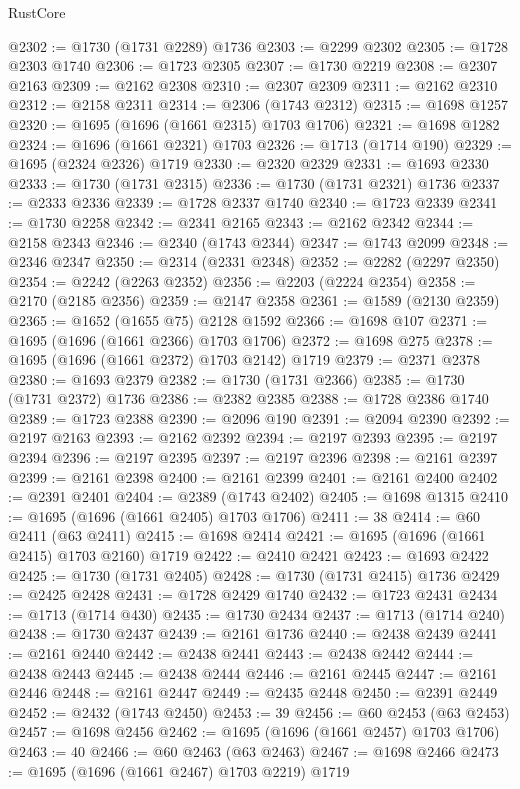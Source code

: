 \begin{lexlean}{RustCore}
\begin{coremodule}
@2302 := @1730 (@1731 @2289) @1736
@2303 := @2299 @2302
@2305 := @1728 @2303 @1740
@2306 := @1723 @2305
@2307 := @1730 @2219
@2308 := @2307 @2163
@2309 := @2162 @2308
@2310 := @2307 @2309
@2311 := @2162 @2310
@2312 := @2158 @2311
@2314 := @2306 (@1743 @2312)
@2315 := @1698 @1257
@2320 := @1695 (@1696 (@1661 @2315) @1703 @1706)
@2321 := @1698 @1282
@2324 := @1696 (@1661 @2321) @1703
@2326 := @1713 (@1714 @190)
@2329 := @1695 (@2324 @2326) @1719
@2330 := @2320 @2329
@2331 := @1693 @2330
@2333 := @1730 (@1731 @2315)
@2336 := @1730 (@1731 @2321) @1736
@2337 := @2333 @2336
@2339 := @1728 @2337 @1740
@2340 := @1723 @2339
@2341 := @1730 @2258
@2342 := @2341 @2165
@2343 := @2162 @2342
@2344 := @2158 @2343
@2346 := @2340 (@1743 @2344)
@2347 := @1743 @2099
@2348 := @2346 @2347
@2350 := @2314 (@2331 @2348)
@2352 := @2282 (@2297 @2350)
@2354 := @2242 (@2263 @2352)
@2356 := @2203 (@2224 @2354)
@2358 := @2170 (@2185 @2356)
@2359 := @2147 @2358
@2361 := @1589 (@2130 @2359)
@2365 := @1652 (@1655 @75) @2128 @1592
@2366 := @1698 @107
@2371 := @1695 (@1696 (@1661 @2366) @1703 @1706)
@2372 := @1698 @275
@2378 := @1695 (@1696 (@1661 @2372) @1703 @2142) @1719
@2379 := @2371 @2378
@2380 := @1693 @2379
@2382 := @1730 (@1731 @2366)
@2385 := @1730 (@1731 @2372) @1736
@2386 := @2382 @2385
@2388 := @1728 @2386 @1740
@2389 := @1723 @2388
@2390 := @2096 @190
@2391 := @2094 @2390
@2392 := @2197 @2163
@2393 := @2162 @2392
@2394 := @2197 @2393
@2395 := @2197 @2394
@2396 := @2197 @2395
@2397 := @2197 @2396
@2398 := @2161 @2397
@2399 := @2161 @2398
@2400 := @2161 @2399
@2401 := @2161 @2400
@2402 := @2391 @2401
@2404 := @2389 (@1743 @2402)
@2405 := @1698 @1315
@2410 := @1695 (@1696 (@1661 @2405) @1703 @1706)
@2411 := 38
@2414 := @60 @2411 (@63 @2411)
@2415 := @1698 @2414
@2421 := @1695 (@1696 (@1661 @2415) @1703 @2160) @1719
@2422 := @2410 @2421
@2423 := @1693 @2422
@2425 := @1730 (@1731 @2405)
@2428 := @1730 (@1731 @2415) @1736
@2429 := @2425 @2428
@2431 := @1728 @2429 @1740
@2432 := @1723 @2431
@2434 := @1713 (@1714 @430)
@2435 := @1730 @2434
@2437 := @1713 (@1714 @240)
@2438 := @1730 @2437
@2439 := @2161 @1736
@2440 := @2438 @2439
@2441 := @2161 @2440
@2442 := @2438 @2441
@2443 := @2438 @2442
@2444 := @2438 @2443
@2445 := @2438 @2444
@2446 := @2161 @2445
@2447 := @2161 @2446
@2448 := @2161 @2447
@2449 := @2435 @2448
@2450 := @2391 @2449
@2452 := @2432 (@1743 @2450)
@2453 := 39
@2456 := @60 @2453 (@63 @2453)
@2457 := @1698 @2456
@2462 := @1695 (@1696 (@1661 @2457) @1703 @1706)
@2463 := 40
@2466 := @60 @2463 (@63 @2463)
@2467 := @1698 @2466
@2473 := @1695 (@1696 (@1661 @2467) @1703 @2219) @1719

\end{coremodule}
\end{lexlean}
